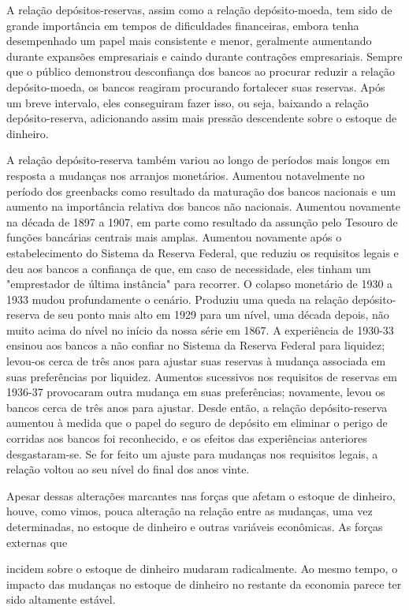 \documentclass[12pt]{article}
\begin{document}
A relação depósitos-reservas, assim como a relação depósito-moeda, tem sido de grande importância em tempos de dificuldades financeiras, embora tenha desempenhado um papel mais consistente e menor, geralmente aumentando durante expansões empresariais e caindo durante contrações empresariais. Sempre que o público demonstrou desconfiança dos bancos ao procurar reduzir a relação depósito-moeda, os bancos reagiram procurando fortalecer suas reservas. Após um breve intervalo, eles conseguiram fazer isso, ou seja, baixando a relação depósito-reserva, adicionando assim mais pressão descendente sobre o estoque de dinheiro.

A relação depósito-reserva também variou ao longo de períodos mais longos em resposta a mudanças nos arranjos monetários. Aumentou notavelmente no período dos greenbacks como resultado da maturação dos bancos nacionais e um aumento na importância relativa dos bancos não nacionais. Aumentou novamente na década de 1897 a 1907, em parte como resultado da assunção pelo Tesouro de funções bancárias centrais mais amplas. Aumentou novamente após o estabelecimento do Sistema da Reserva Federal, que reduziu os requisitos legais e deu aos bancos a confiança de que, em caso de necessidade, eles tinham um "emprestador de última instância" para recorrer. O colapso monetário de 1930 a 1933 mudou profundamente o cenário. Produziu uma queda na relação depósito-reserva de seu ponto mais alto em 1929 para um nível, uma década depois, não muito acima do nível no início da nossa série em 1867. A experiência de 1930-33 ensinou aos bancos a não confiar no Sistema da Reserva Federal para liquidez; levou-os cerca de três anos para ajustar suas reservas à mudança associada em suas preferências por liquidez. Aumentos sucessivos nos requisitos de reservas em 1936-37 provocaram outra mudança em suas preferências; novamente, levou os bancos cerca de três anos para ajustar. Desde então, a relação depósito-reserva aumentou à medida que o papel do seguro de depósito em eliminar o perigo de corridas aos bancos foi reconhecido, e os efeitos das experiências anteriores desgastaram-se. Se for feito um ajuste para mudanças nos requisitos legais, a relação voltou ao seu nível do final dos anos vinte.

Apesar dessas alterações marcantes nas forças que afetam o estoque de dinheiro, houve, como vimos, pouca alteração na relação entre as mudanças, uma vez determinadas, no estoque de dinheiro e outras variáveis econômicas. As forças externas que

 incidem sobre o estoque de dinheiro mudaram radicalmente. Ao mesmo tempo, o impacto das mudanças no estoque de dinheiro no restante da economia parece ter sido altamente estável.
\end{document}
